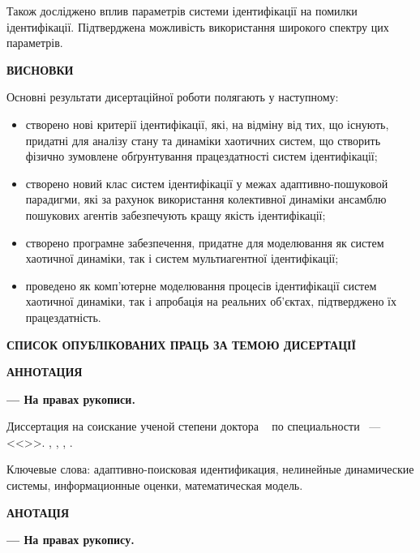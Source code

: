 \documentclass[a4paper,13pt]{atuaref}
\newcommand{\xsect}[1]{\medskip\begin{center}\textbf{#1}\end{center}\medskip\penalty10000}
\begin{document}
Також досліджено вплив параметрів системи ідентифікації на помилки ідентифікації.
Підтверджена можливість використання широкого спектру цих параметрів.



\xsect{ВИСНОВКИ}

Основні результати дисертаційної роботи полягають у наступному:

\begin{itemize}

  \item
  створено нові критерії ідентифікації, які, на відміну від тих, що
  існують, придатні для аналізу стану та динаміки
  хаотичних систем, що створить фізично зумовлене обґрунтування працездатності систем
  ідентифікації;

  \item
  створено новий клас систем ідентифікації у межах
    адаптивно-пошуковой парадигми,
    які за рахунок використання колективної динаміки
    ансамблю пошукових агентів забезпечують
    кращу якість ідентифікації;

  \item
  створено програмне забезпечення, придатне для моделювання як систем
  хаотичної динаміки, так і систем мультиагентної ідентифікації;

  \item
  проведено як комп'ютерне моделювання процесів ідентифікації систем
    хаотичної динаміки, так і апробація на реальних об'єктах, підтверджено їх працездатність.


\end{itemize}


\xsect{СПИСОК ОПУБЛІКОВАНИХ ПРАЦЬ ЗА ТЕМОЮ ДИСЕРТАЦІЇ}

\nocite{*}

\printbibliography[heading=none]




\xsect{АННОТАЦИЯ}

\textbf{\dissauthorRu}
\textbf{\booknameRu}
\textbf{--- На правах рукописи.}

Диссертация на соискание ученой степени
доктора
\dissScopeRu\ {}
по специальности
\dissSpecId\ --- <<\dissSpecRu>>.
\institutionRu, \belongRu, \cityRu, \bookyear.


Ключевые слова:
адаптивно-поисковая идентификация, нелинейные динамические системы,
информационные оценки, математическая модель.


\xsect{АНОТАЦІЯ}

\textbf{\dissauthorUa}
\textbf{\booknameUa}
\textbf{--- На правах рукопису.}
\end{document}
